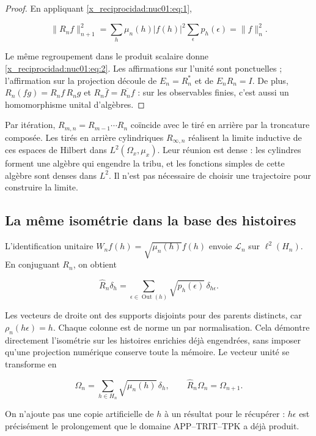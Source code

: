 \begin{proof}
En appliquant \eqref{x_reciprocidad:nuc01:eq:1},

\[
\|R_nf\|_{n+1}^2
=\sum_h\mu_n(h)|f(h)|^2\sum_\epsilon p_h(\epsilon)
=\|f\|_n^2.
\]

Le même regroupement dans le produit scalaire donne \eqref{x_reciprocidad:nuc01:eq:2}. Les affirmations sur l’unité sont ponctuelles ; l’affirmation sur la projection découle de \(E_n=R_n^*\) et de \(E_nR_n=I\). De plus, \(R_n(fg)=R_nf\,R_ng\) et \(R_n\bar f=\overline{R_nf}\) : sur les observables finies, c’est aussi un homomorphisme unital d’algèbres.
\end{proof}

Par itération, \(R_{m,n}=R_{m-1}\cdots R_n\) coïncide avec le tiré en arrière par la troncature composée. Les tirés en arrière cylindriques \(R_{\infty,n}\) réalisent la limite inductive de ces espaces de Hilbert dans \(L^2(\Omega_x,\mu_x)\). Leur réunion est dense : les cylindres forment une algèbre qui engendre la tribu, et les fonctions simples de cette algèbre sont denses dans \(L^2\). Il n’est pas nécessaire de choisir une trajectoire pour construire la limite.

\subsection{La même isométrie dans la base des histoires}

L’identification unitaire \(W_nf(h)=\sqrt{\mu_n(h)}f(h)\) envoie \(\mathscr L_n\) sur \(\ell^2(H_n)\). En conjuguant \(R_n\), on obtient

\begin{equation}
\widehat R_n\delta_h
=\sum_{\epsilon\in\operatorname{Out}(h)}\sqrt{p_h(\epsilon)}\,\delta_{h\epsilon}.
\label{x_reciprocidad:nuc01:eq:3}
\end{equation}

Les vecteurs de droite ont des supports disjoints pour des parents distincts, car \(\rho_n(h\epsilon)=h\). Chaque colonne est de norme un par normalisation. Cela démontre directement l’isométrie sur les histoires enrichies déjà engendrées, sans imposer qu’une projection numérique conserve toute la mémoire. Le vecteur unité se transforme en

\[
\Omega_n=\sum_{h\in H_n}\sqrt{\mu_n(h)}\,\delta_h,
\qquad \widehat R_n\Omega_n=\Omega_{n+1}.
\]

On n’ajoute pas une copie artificielle de \(h\) à un résultat pour le récupérer : \(h\epsilon\) est précisément le prolongement que le domaine APP–TRIT–TPK a déjà produit.


